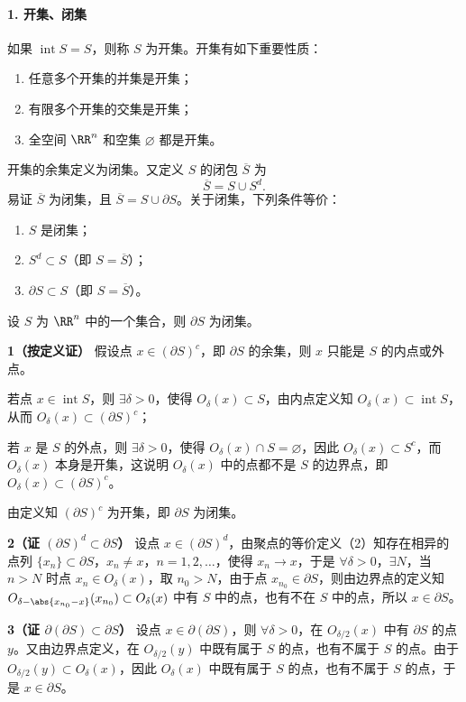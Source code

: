 \paragraph{1. 开集、闭集}
如果 $\operatorname{int}S=S$，则称 $S$ 为开集。开集有如下重要性质：
\begin{enumerate}[label=(\arabic*)]
  \item 任意多个开集的并集是开集；
  \item 有限多个开集的交集是开集；
  \item 全空间 $\RR^n$ 和空集 $\varnothing$ 都是开集。
\end{enumerate}

开集的余集定义为闭集。又定义 $S$ 的闭包 $\overline S$ 为
\[
  \overline S=S\cup S^d.
\]
易证 $\overline S$ 为闭集，且 $\overline S=S\cup\partial S$。关于闭集，下列条件等价：
\begin{enumerate}[label=(\arabic*)]
  \item $S$ 是闭集；
  \item $S^d\subset S$（即 $S=\overline S$）；
  \item $\partial S\subset S$（即 $S=\overline S$）。
\end{enumerate}

\begin{xexample}[17.1.2]
设 $S$ 为 $\RR^n$ 中的一个集合，则 $\partial S$ 为闭集。
\end{xexample}
\begin{xproof}
\textbf{1（按定义证）} 假设点 $x\in(\partial S)^c$，即 $\partial S$ 的余集，则 $x$ 只能是 $S$ 的内点或外点。

若点 $x\in\operatorname{int}S$，则 $\exists\delta>0$，使得 $O_\delta(x)\subset S$，由内点定义知 $O_\delta(x)\subset\operatorname{int}S$，从而 $O_\delta(x)\subset(\partial S)^c$；

若 $x$ 是 $S$ 的外点，则 $\exists\delta>0$，使得 $O_\delta(x)\cap S=\varnothing$，因此 $O_\delta(x)\subset S^c$，而 $O_\delta(x)$ 本身是开集，这说明 $O_\delta(x)$ 中的点都不是 $S$ 的边界点，即 $O_\delta(x)\subset(\partial S)^c$。

由定义知 $(\partial S)^c$ 为开集，即 $\partial S$ 为闭集。
\end{xproof}
\begin{xproof}
\textbf{2（证 $(\partial S)^d\subset\partial S$）} 设点 $x\in(\partial S)^d$，由聚点的等价定义（2）知存在相异的点列 $\{x_n\}\subset\partial S$，$x_n\neq x$，$n=1,2,\ldots$，使得 $x_n\to x$，于是 $\forall\delta>0$，$\exists N$，当 $n>N$ 时点 $x_n\in O_\delta(x)$，取 $n_0>N$，由于点 $x_{n_0}\in\partial S$，则由边界点的定义知 $O_{\delta-\abs{x_{n_0}-x}}(x_{n_0})\subset O_\delta(x)$ 中有 $S$ 中的点，也有不在 $S$ 中的点，所以 $x\in\partial S$。
\end{xproof}
\begin{xproof}
\textbf{3（证 $\partial(\partial S)\subset\partial S$）} 设点 $x\in\partial(\partial S)$，则 $\forall\delta>0$，在 $O_{\delta/2}(x)$ 中有 $\partial S$ 的点 $y$。又由边界点定义，在 $O_{\delta/2}(y)$ 中既有属于 $S$ 的点，也有不属于 $S$ 的点。由于 $O_{\delta/2}(y)\subset O_\delta(x)$，因此 $O_\delta(x)$ 中既有属于 $S$ 的点，也有不属于 $S$ 的点，于是 $x\in\partial S$。
\end{xproof}

